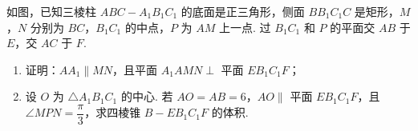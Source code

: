 \begin{problem}
如图，已知三棱柱 \(ABC-A_1B_1C_1\) 的底面是正三角形，侧面 \(BB_1C_1C\) 是矩形，\(M\)，\(N\) 分别为 \(BC\)，\(B_1C_1\) 的中点，\(P\) 为 \(AM\) 上一点. 过 \(B_1C_1\) 和 \(P\) 的平面交 \(AB\) 于 \(E\)，交 \(AC\) 于 \(F\).

\begin{enumerate}
\item 证明：\(AA_1\parallel MN\)，且平面 \(A_1AMN\perp\) 平面 \(EB_1C_1F\)；
\item 设 \(O\) 为 \(\triangle A_1B_1C_1\) 的中心. 若 \(AO=AB=6\)，\(AO\parallel\) 平面 \(EB_1C_1F\)，且 \(\angle MPN=\dfrac{\pi}{3}\)，求四棱锥 \(B-EB_1C_1F\) 的体积.
\end{enumerate}

\end{problem}

